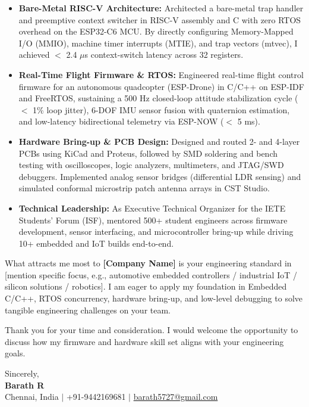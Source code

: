 \documentclass[a4paper,10pt]{article}
\begin{document}
\begin{itemize}[leftmargin=14pt, itemsep=3pt, topsep=2pt]
    \item \textbf{Bare-Metal RISC-V Architecture:} Architected a bare-metal trap handler and preemptive context switcher in RISC-V assembly and C with zero RTOS overhead on the ESP32-C6 MCU. By directly configuring Memory-Mapped I/O (MMIO), machine timer interrupts (MTIE), and trap vectors (mtvec), I achieved $<$ 2.4 $\mu$s context-switch latency across 32 registers.
    \item \textbf{Real-Time Flight Firmware \& RTOS:} Engineered real-time flight control firmware for an autonomous quadcopter (ESP-Drone) in C/C++ on ESP-IDF and FreeRTOS, sustaining a 500 Hz closed-loop attitude stabilization cycle ($<$ 1\% loop jitter), 6-DOF IMU sensor fusion with quaternion estimation, and low-latency bidirectional telemetry via ESP-NOW ($<$ 5 ms).
    \item \textbf{Hardware Bring-up \& PCB Design:} Designed and routed 2- and 4-layer PCBs using KiCad and Proteus, followed by SMD soldering and bench testing with oscilloscopes, logic analyzers, multimeters, and JTAG/SWD debuggers. Implemented analog sensor bridges (differential LDR sensing) and simulated conformal microstrip patch antenna arrays in CST Studio.
    \item \textbf{Technical Leadership:} As Executive Technical Organizer for the IETE Students' Forum (ISF), mentored 500+ student engineers across firmware development, sensor interfacing, and microcontroller bring-up while driving 10+ embedded and IoT builds end-to-end.
\end{itemize}

What attracts me most to \textbf{[Company Name]} is your engineering standard in [mention specific focus, e.g., automotive embedded controllers / industrial IoT / silicon solutions / robotics]. I am eager to apply my foundation in Embedded C/C++, RTOS concurrency, hardware bring-up, and low-level debugging to solve tangible engineering challenges on your team.

Thank you for your time and consideration. I would welcome the opportunity to discuss how my firmware and hardware skill set aligns with your engineering goals.

\vspace{12pt}
\noindent Sincerely, \\[16pt]
\textbf{Barath R} \\
Chennai, India $\vert$ +91-9442169681 $\vert$ \href{mailto:barath5727@gmail.com}{barath5727@gmail.com}
\end{document}
